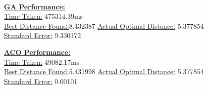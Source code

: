 \documentclass[11pt,a4paper,final]{article}
\begin{document}
	\hspace{0pt}\\
	\begin{minipage}{0.475\textwidth}
		\textbf{\underline{GA Performance:}}\\
		\underline{Time Taken:} 475314.39ms\\
		\underline{Best Distance Found:}{\hspace{2pt}}8.432387
		\underline{Actual Optimal Distance:} 5.377854\\
		\underline{Standard Error:} 9.330172
	\end{minipage}
	\begin{minipage}{0.475\textwidth}
		\textbf{\underline{ACO Performance:}}\\
		\underline{Time Taken:} 49082.17ms\\
		\underline{Best Distance Found:}{\hspace{2pt}}5.431998
		\underline{Actual Optimal Distance:} 5.377854\\
		\underline{Standard Error:} 0.00101
	\end{minipage}
	
\end{document}
